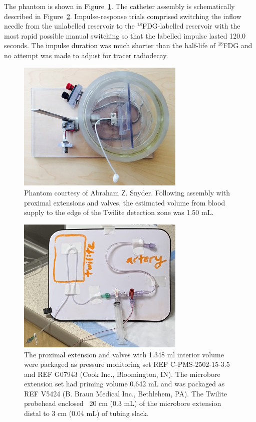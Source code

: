 The phantom is shown in Figure~\ref{fig:catheter-phantom}.  The catheter
assembly is schematically described in Figure~\ref{fig:photo-schematic}.  
Impulse-response trials comprised switching the inflow needle from the 
unlabelled reservoir to the $^{18}$FDG-labelled reservoir with the most
rapid possible manual switching so that the labelled impulse lasted 120.0 
seconds.  The impulse duration was much shorter than the half-life of
$^{18}$FDG and no attempt was made to adjust for tracer radiodecay.

\begin{figure}[h]
\includegraphics[width=8cm]{catheter-phantom.png}
\caption{Phantom courtesy of Abraham Z. Snyder.  Following assembly with proximal extensions and valves, the estimated volume from blood supply to the edge of the Twilite detection zone was 1.50 mL.\label{fig:catheter-phantom}}
\end{figure}

\begin{figure}[h]
\includegraphics[width=8cm]{photo-schematic.png}
\caption{The proximal extension and valves with 1.348 ml interior volume were packaged as pressure monitoring set REF C-PMS-2502-15-3.5 and REF G07943 (Cook Inc., Bloomington, IN).  The microbore extension set had priming volume 0.642 mL and was packaged as REF V5424 (B. Braun Medical Inc., Bethlehem, PA).  The Twilite probehead enclosed ~20 cm (0.3 mL) of the microbore extension distal to 3 cm (0.04 mL) of tubing slack. \label{fig:photo-schematic}}
\end{figure}

